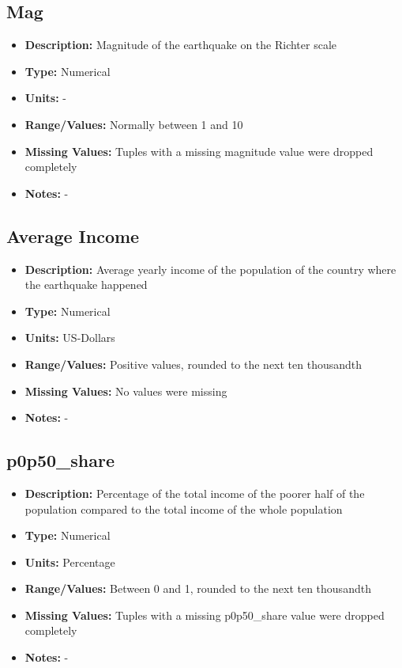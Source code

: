 \documentclass{article}
\begin{document}
\subsection{Mag}
\begin{itemize}
    \item \textbf{Description:} Magnitude of the earthquake on the Richter scale
    \item \textbf{Type:} Numerical
    \item \textbf{Units:} -
    \item \textbf{Range/Values:} Normally between 1 and 10
    \item \textbf{Missing Values:} Tuples with a missing magnitude value were dropped completely
    \item \textbf{Notes:} -
\end{itemize}

\subsection{Average Income}
\begin{itemize}
    \item \textbf{Description:} Average yearly income of the population of the country where the earthquake happened
    \item \textbf{Type:} Numerical
    \item \textbf{Units:} US-Dollars
    \item \textbf{Range/Values:} Positive values, rounded to the next ten thousandth
    \item \textbf{Missing Values:} No values were missing
    \item \textbf{Notes:} -
\end{itemize}

\subsection{p0p50\_share}
\begin{itemize}
    \item \textbf{Description:} Percentage of the total income of the poorer half of the population compared to the total income of the whole population
    \item \textbf{Type:} Numerical
    \item \textbf{Units:} Percentage
    \item \textbf{Range/Values:} Between 0 and 1, rounded to the next ten thousandth
    \item \textbf{Missing Values:} Tuples with a missing p0p50\_share value were dropped completely
    \item \textbf{Notes:} -
\end{itemize}
\end{document}
